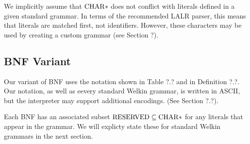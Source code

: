 
We implicitly assume that $\mathrm{CHAR}*$ does not conflict with literals defined in a given standard grammar. In terms of the recommended LALR parser, this means that literals are matched first, not identifiers. However, these characters may be used by creating a custom grammar (see Section ?).


\subsection{BNF Variant}
Our variant of BNF uses the notation shown in Table ?.? and in Definition ?.?. Our notation, as well as eevery standard Welkin grammar, is written in ASCII, but the interpreter may support additional encodings. (See Section ?.?).

Each BNF has an associated subset $\mathrm{RESERVED} \subseteq \mathrm{CHAR}*$ for any literals that appear in the grammar. We will explicty state these for standard Welkin grammars in the next section.

